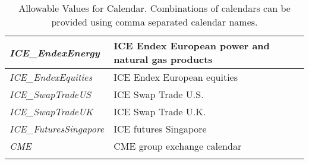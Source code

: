 \begin{longtable}{| p{} | p{} |}
    \emph{ICE\_EndexEnergy} & ICE Endex European power and natural gas products \\ \hline
    \emph{ICE\_EndexEquities} & ICE Endex European equities \\ \hline
    \emph{ICE\_SwapTradeUS} & ICE Swap Trade U.S. \\ \hline
    \emph{ICE\_SwapTradeUK} & ICE Swap Trade U.K. \\ \hline
    \emph{ICE\_FuturesSingapore} & ICE futures Singapore \\ \hline
    \emph{CME} & CME group exchange calendar \\ \hline
  \caption{Allowable Values for Calendar. Combinations of calendars can be provided using comma separated calendar names.}
  \label{tab:calendar}
\end{longtable}

